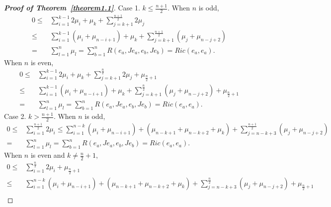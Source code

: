 \documentclass[10pt,a4paper]{amsart}
\begin{document}
\begin{proof}[{\bf Proof of Theorem~\ref{theorem1.1}}]
Case 1. $k\le \frac{n+1}{2}$.  When $n$ is odd,
\begin{align*}
  0 \le & \sum\limits_{i = 1}^{k - 1} {2\mu _i}  + {\mu _k} + \sum\limits_{j = k + 1}^{\frac{{n + 1}}{2}} {2{\mu _j}} \\
   \le & \sum\limits_{i = 1}^{k - 1} {\left( {{\mu _i} + {\mu _{n - i + 1}}} \right)}  + {\mu _k} + \sum\limits_{j = k + 1}^{\frac{{n + 1}}{2}} {\left( {{\mu _j} + {\mu _{n - j + 2}}} \right)} \\
   =& \sum\limits_{l = 1}^n {{\mu _l}}  = \sum\limits_{b = 1}^n {R\left( {{e_a},J{e_a},{e_b},J{e_b}} \right)}
   =Ric\left( {{e_a},{e_a}} \right).
\end{align*}
When $n$ is even,
\begin{align*}
  0 \le & \sum\limits_{i = 1}^{k - 1} {2\mu _i}  + {\mu _k} + \sum\limits_{j = k + 1}^{\frac{n}{2}} {2{\mu _j}}  + {\mu _{\frac{n}{2} + 1}}  \\
   \le & \sum\limits_{i = 1}^{k - 1} {\left( {{\mu _i} + {\mu _{n - i + 1}}} \right)}  + {\mu _k} + \sum\limits_{j = k + 1}^{\frac{n}{2}} {\left( {{\mu _j} + {\mu _{n - j + 2}}} \right)}  + {\mu _{\frac{n}{2} + 1}} \\
   =& \sum\limits_{l = 1}^n {{\mu _l}}  = \sum\limits_{b = 1}^n {R\left( {{e_a},J{e_a},{e_b},J{e_b}} \right)}
   = Ric\left( {{e_a},{e_a}} \right) .
\end{align*}
Case 2.  $k > \frac{n+1}{2}$. When $n$ is odd,
\begin{align*}
0 \le & \sum\limits_{i = 1}^{\frac{{n + 1}}{2}} {2{\mu _i}}
 \le  \sum\limits_{i = 1}^{n - k} {\left( {{\mu _i} + {\mu _{n - i + 1}}} \right)}  + \left( {{\mu _{n - k + 1}} + {\mu _{n - k + 2}} + {\mu _k}} \right) + \sum\limits_{j = n - k + 3}^{\frac{{n + 1}}{2}} {\left( {{\mu _j} + {\mu _{n - j + 2}}} \right)} \\
 = & \sum\limits_{l = 1}^n {{\mu _l}}  = \sum\limits_{b = 1}^n {R\left( {{e_a},J{e_a},{e_b},J{e_b}} \right)}
 =  Ric\left( {{e_a},{e_a}} \right).
\end{align*}
When $n$ is even and $k \ne \frac{n}{2}+1$,
\begin{align*}
0 \le & \sum\limits_{i = 1}^{\frac{n}{2}} {2{\mu _i}}  + {\mu _{\frac{n}{2} + 1}}\\
 \le & \sum\limits_{i = 1}^{n - k} {\left( {{\mu _i} + {\mu _{n - i + 1}}} \right)}  + \left( {{\mu _{n - k + 1}} + {\mu _{n - k + 2}} + {\mu _k}} \right) + \sum\limits_{j = n - k + 3}^{\frac{n}{2}} {\left( {{\mu _j} + {\mu _{n - j + 2}}} \right)}  + {\mu _{\frac{n}{2} + 1}}\\

\end{align*}
\end{proof}
\end{document}

